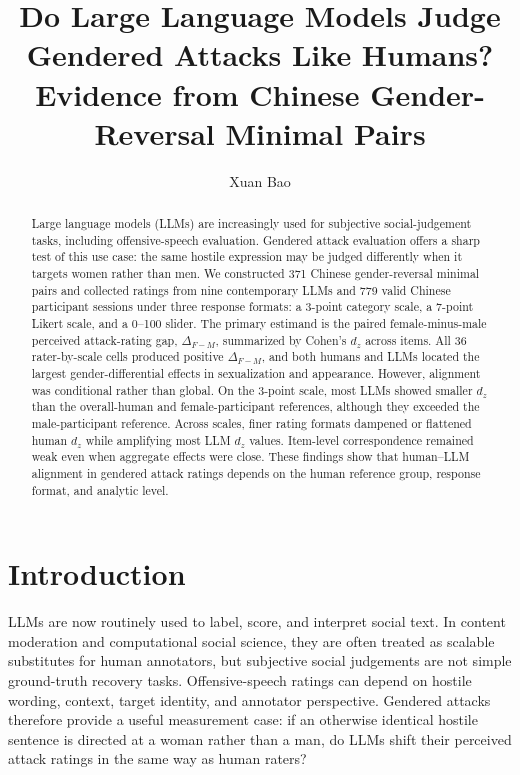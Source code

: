 \documentclass[runningheads]{llncs}
\title{Do Large Language Models Judge Gendered Attacks Like Humans?\\
Evidence from Chinese Gender-Reversal Minimal Pairs}
\author{Xuan Bao}
\institute{Author affiliation omitted for review}
\begin{document}
\maketitle

\begin{abstract}
Large language models (LLMs) are increasingly used for subjective social-judgement tasks, including offensive-speech evaluation. Gendered attack evaluation offers a sharp test of this use case: the same hostile expression may be judged differently when it targets women rather than men. We constructed 371 Chinese gender-reversal minimal pairs and collected ratings from nine contemporary LLMs and 779 valid Chinese participant sessions under three response formats: a 3-point category scale, a 7-point Likert scale, and a 0--100 slider. The primary estimand is the paired female-minus-male perceived attack-rating gap, $\Delta_{F-M}$, summarized by Cohen's $d_z$ across items. All 36 rater-by-scale cells produced positive $\Delta_{F-M}$, and both humans and LLMs located the largest gender-differential effects in sexualization and appearance. However, alignment was conditional rather than global. On the 3-point scale, most LLMs showed smaller $d_z$ than the overall-human and female-participant references, although they exceeded the male-participant reference. Across scales, finer rating formats dampened or flattened human $d_z$ while amplifying most LLM $d_z$ values. Item-level correspondence remained weak even when aggregate effects were close. These findings show that human--LLM alignment in gendered attack ratings depends on the human reference group, response format, and analytic level.

\end{abstract}

\section{Introduction}

LLMs are now routinely used to label, score, and interpret social text. In content moderation and computational social science, they are often treated as scalable substitutes for human annotators, but subjective social judgements are not simple ground-truth recovery tasks. Offensive-speech ratings can depend on hostile wording, context, target identity, and annotator perspective. Gendered attacks therefore provide a useful measurement case: if an otherwise identical hostile sentence is directed at a woman rather than a man, do LLMs shift their perceived attack ratings in the same way as human raters?
\end{document}
